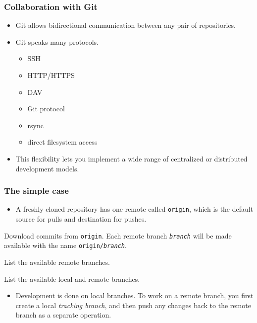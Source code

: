 \documentclass{beamer}
\begin{document}
\begin{frame}
  \frametitle{Collaboration with Git}
  \begin{itemize}
  \item Git allows bidirectional communication between any pair of
    repositories.
  \item Git speaks many protocols.
    \begin{itemize}
    \item SSH
    \item HTTP/HTTPS
    \item DAV
    \item Git protocol
    \item rsync
    \item direct filesystem access
    \end{itemize}
  \item This flexibility lets you implement a wide range of
    centralized or distributed development models.
  \end{itemize}
\end{frame}

\begin{frame}
  \frametitle{The simple case}

  \begin{itemize}
  \item A freshly cloned repository has one remote called
    \texttt{origin}, which is the default source for pulls and
    destination for pushes.
  \end{itemize}

  \begin{description}
  \item[\texttt{git fetch}] Download commits from \texttt{origin}.
    Each remote branch \texttt{\textit{branch}} will be made available
    with the name \texttt{origin/\textit{branch}}.
  \item[\texttt{git branch -r}] List the available remote branches.
  \item[\texttt{git branch -a}] List the available local and remote branches.
  \end{description}

  \begin{itemize}
  \item Development is done on local branches.  To work on a remote
    branch, you first create a local \emph{tracking branch}, and then
    push any changes back to the remote branch as a separate
    operation.
  \end{itemize}
\end{frame}
\end{document}
